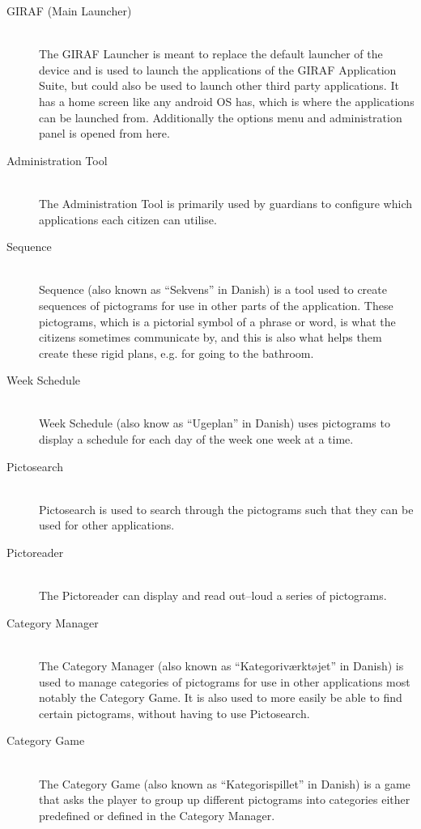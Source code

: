 \begin{description}
	\item[GIRAF (Main Launcher)]\hfill \\
	The GIRAF Launcher is meant to replace the default launcher of the device and is used to launch the applications of the GIRAF Application Suite, but could also be used to launch other third party applications.
	It has a home screen like any android OS has, which is where the applications can be launched from.
	Additionally the options menu and administration panel is opened from here.
	\item[Administration Tool]\hfill \\
	The Administration Tool is primarily used by guardians to configure which applications each citizen can utilise.
	\item[Sequence] \hfill \\
	Sequence (also known as \enquote{Sekvens} in Danish) is a tool used to create sequences of pictograms for use in other parts of the application.
	These pictograms, which is a pictorial symbol of a phrase or word, is what the citizens sometimes communicate by, and this is also what helps them create these rigid plans, e.g. for going to the bathroom.
	\item[Week Schedule] \hfill \\
	Week Schedule (also know as \enquote{Ugeplan} in Danish) uses pictograms to display a schedule for each day of the week one week at a time.
	\item[Pictosearch] \hfill \\
	Pictosearch is used to search through the pictograms such that they can be used for other applications.
	\item[Pictoreader] \hfill \\
	The Pictoreader can display and read out--loud a series of pictograms.
	\item[Category Manager] \hfill \\
	The Category Manager (also known as \enquote{Kategoriværktøjet} in Danish) is used to manage categories of pictograms for use in other applications most notably the Category Game.
	It is also used to more easily be able to find certain pictograms, without having to use Pictosearch.
	\item[Category Game] \hfill \\
	The Category Game (also known as \enquote{Kategorispillet} in Danish) is a game that asks the player to group up different pictograms into categories either predefined or defined in the Category Manager.

\end{description}
